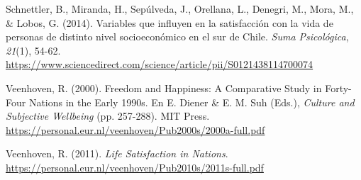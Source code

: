 \documentclass[
  spanish,
  a4paper,
  oneside]{scrbook}
\newlength{\cslhangindent}
\newenvironment{CSLReferences}[2] %
 {\begin{list}{}{%
  \setlength{\itemindent}{0pt}
  \setlength{\leftmargin}{0pt}
  \setlength{\parsep}{0pt}
  \ifodd #1
   \setlength{\leftmargin}{\cslhangindent}
   \setlength{\itemindent}{-1\cslhangindent}
  \fi
  \setlength{\itemsep}{#2\baselineskip}}}
 {\end{list}}
\begin{document}
\begin{CSLReferences}{1}{0}
Schnettler, B., Miranda, H., Sepúlveda, J., Orellana, L., Denegri, M.,
Mora, M., \& Lobos, G. (2014). Variables que influyen en la satisfacción
con la vida de personas de distinto nivel socioeconómico en el sur de
{Chile}. \emph{Suma Psicológica}, \emph{21}(1), 54-62.
\url{https://www.sciencedirect.com/science/article/pii/S0121438114700074}

Veenhoven, R. (2000). Freedom and Happiness: {A} Comparative Study in
Forty-Four Nations in the Early 1990s. En E. Diener \& E. M. Suh (Eds.),
\emph{Culture and Subjective Wellbeing} (pp. 257-288). MIT Press.
\url{https://personal.eur.nl/veenhoven/Pub2000s/2000a-full.pdf}

Veenhoven, R. (2011). \emph{Life Satisfaction in Nations}.
\url{https://personal.eur.nl/veenhoven/Pub2010s/2011s-full.pdf}

\end{CSLReferences}


\backmatter

\mainmatter
\pagestyle{scrheadings}

\end{document}
